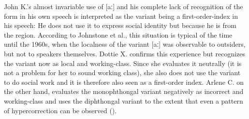 John K.’s almost invariable use of [aː] and his complete lack of recognition of the form in his own speech is interpreted as the variant being a first-order-index in his speech: He does not use it to express social identity but because he is from the region. According to Johnstone et al., this situation is typical of the time until the 1960s, when the localness of the variant [aː] was observable to outsiders, but not to speakers themselves. Dottie X. confirms this experience but recognizes the variant now as local and working-class. Since she evaluates it neutrally (it is not a problem for her to sound working class), she also does not use the variant to do social work and it is therefore also seen as a first-order index. Arlene C. on the other hand, evaluates the monophthongal variant negatively as incorrect and working-class and uses the diphthongal variant to the extent that even a pattern of hypercorrection can be observed (\citeyear[91]{Johnstone2006}).


